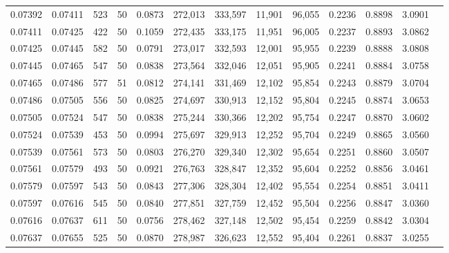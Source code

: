 \begin{tabular}{rrrrrrrrrrrrr}
0.07392 & 0.07411 &   523 &  50 &                                     0.0873 & 272,013 & 333,597 &  11,901 &  96,055 & 0.2236 & 0.8898 & 3.0901 \\
0.07411 & 0.07425 &   422 &  50 &                                     0.1059 & 272,435 & 333,175 &  11,951 &  96,005 & 0.2237 & 0.8893 & 3.0862 \\
0.07425 & 0.07445 &   582 &  50 &                                     0.0791 & 273,017 & 332,593 &  12,001 &  95,955 & 0.2239 & 0.8888 & 3.0808 \\
0.07445 & 0.07465 &   547 &  50 &                                     0.0838 & 273,564 & 332,046 &  12,051 &  95,905 & 0.2241 & 0.8884 & 3.0758 \\
0.07465 & 0.07486 &   577 &  51 &                                     0.0812 & 274,141 & 331,469 &  12,102 &  95,854 & 0.2243 & 0.8879 & 3.0704 \\
0.07486 & 0.07505 &   556 &  50 &                                     0.0825 & 274,697 & 330,913 &  12,152 &  95,804 & 0.2245 & 0.8874 & 3.0653 \\
0.07505 & 0.07524 &   547 &  50 &                                     0.0838 & 275,244 & 330,366 &  12,202 &  95,754 & 0.2247 & 0.8870 & 3.0602 \\
0.07524 & 0.07539 &   453 &  50 &                                     0.0994 & 275,697 & 329,913 &  12,252 &  95,704 & 0.2249 & 0.8865 & 3.0560 \\
0.07539 & 0.07561 &   573 &  50 &                                     0.0803 & 276,270 & 329,340 &  12,302 &  95,654 & 0.2251 & 0.8860 & 3.0507 \\
0.07561 & 0.07579 &   493 &  50 &                                     0.0921 & 276,763 & 328,847 &  12,352 &  95,604 & 0.2252 & 0.8856 & 3.0461 \\
0.07579 & 0.07597 &   543 &  50 &                                     0.0843 & 277,306 & 328,304 &  12,402 &  95,554 & 0.2254 & 0.8851 & 3.0411 \\
0.07597 & 0.07616 &   545 &  50 &                                     0.0840 & 277,851 & 327,759 &  12,452 &  95,504 & 0.2256 & 0.8847 & 3.0360 \\
0.07616 & 0.07637 &   611 &  50 &                                     0.0756 & 278,462 & 327,148 &  12,502 &  95,454 & 0.2259 & 0.8842 & 3.0304 \\
0.07637 & 0.07655 &   525 &  50 &                                     0.0870 & 278,987 & 326,623 &  12,552 &  95,404 & 0.2261 & 0.8837 & 3.0255 \\

\end{tabular}
